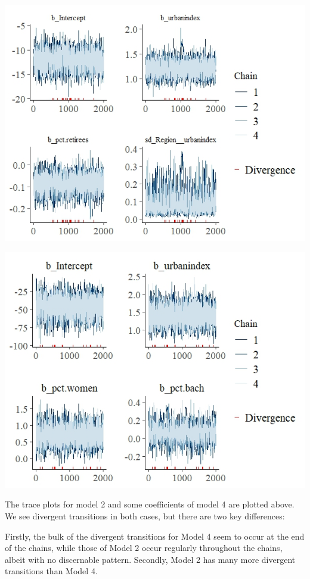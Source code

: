 \documentclass[12pt]{article}
\begin{document}
\includegraphics[scale = 1.2]{trace_plots/trace_model2.jpeg}

\includegraphics[scale = 1.2]{trace_plots/trace_model4_part1.jpeg}

The trace plots for model 2 and some coefficients of model 4 are plotted above. We see divergent transitions in both cases, but there are two key differences:

Firstly, the bulk of the divergent transitions for Model 4 seem to occur at the end of the chains, while those of Model 2 occur regularly throughout the chains, albeit with no discernable pattern. Secondly, Model 2 has many more divergent transitions than Model 4. 
\end{document}
